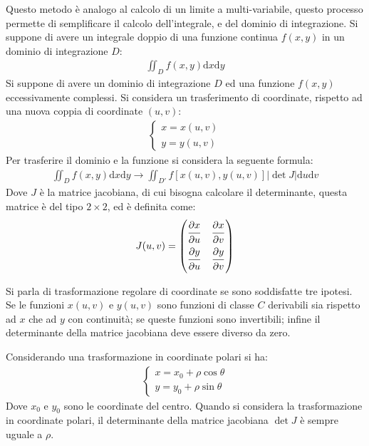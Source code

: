 \documentclass{article}
\newcommand{\df}{\mathrm{d}}
\numberwithin{equation}{subsection}
\begin{document}
Questo metodo è analogo al calcolo di un limite a multi-variabile, questo processo permette di semplificare il calcolo dell'integrale, e del dominio di integrazione. 
Si suppone di avere un integrale doppio di una funzione continua $f(x,y)$ in un dominio di integrazione $D$:
\begin{gather*}
    \iint_Df(x,y)\df x\df y
\end{gather*}
Si suppone di avere un dominio di integrazione $D$ ed una funzione $f(x,y)$ eccessivamente complessi. 
Si considera un trasferimento di coordinate, rispetto ad una nuova coppia di coordinate $(u,v)$:
\begin{gather*}
    \begin{cases}
        x=x(u,v)\\
        y=y(u,v)
    \end{cases}
\end{gather*}
Per trasferire il dominio e la funzione si considera la seguente formula: 
\begin{gather*}
    \iint_Df(x,y)\df x\df y\to
    \iint_{D'}f[x(u,v),y(u,v)]|\det J|\df u\df v
\end{gather*}
Dove $J$ è la matrice jacobiana, di cui bisogna calcolare il determinante, questa matrice è del tipo $2\times 2$, ed è definita come: %
\begin{gather*}
    J(u,v)=\begin{pmatrix}
        \displaystyle\frac{\partial\strut x}{\partial\strut u}&\displaystyle\frac{\partial\strut x}{\partial\strut v}\\
        \displaystyle\frac{\partial\strut y}{\partial\strut u}&\displaystyle\frac{\partial\strut y}{\partial\strut v}
    \end{pmatrix}
\end{gather*}


Si parla di trasformazione regolare di coordinate se sono soddisfatte tre ipotesi. Se le funzioni $x(u,v)$ e $y(u,v)$ sono funzioni di classe $C$ derivabili sia rispetto ad $x$ che ad $y$ con continuità; se queste funzioni sono invertibili; infine il determinante della matrice jacobiana deve essere diverso da zero. 


Considerando una trasformazione in coordinate polari si ha:
\begin{gather*}
    \begin{cases}
        x=x_0+\rho\cos\theta\\
        y=y_0+\rho\sin\theta
    \end{cases}
\end{gather*}
Dove $x_0$ e $y_0$ sono le coordinate del centro. Quando si considera la trasformazione in coordinate polari, il determinante della matrice jacobiana $\det J$ è sempre uguale a $\rho$. 
\end{document}
